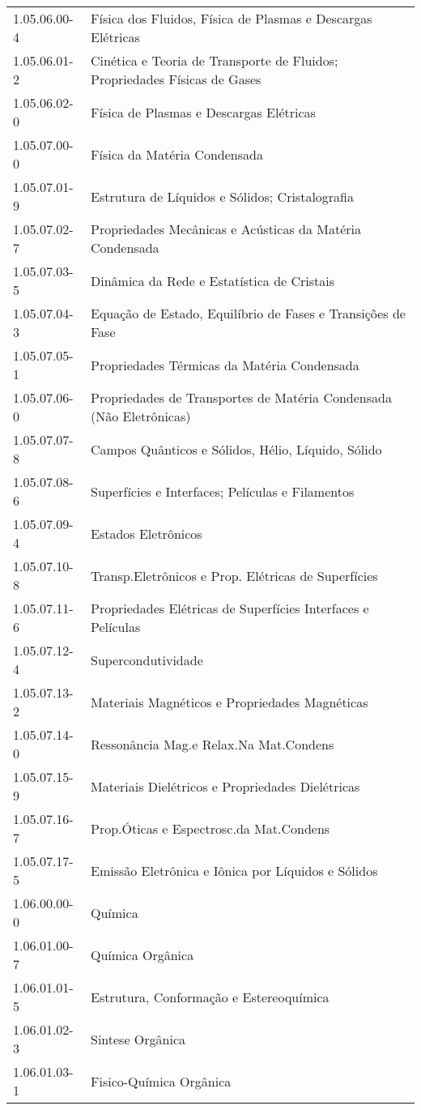 \begin{longtable}[c]{p{2.15cm}p{13cm}}
1.05.06.00-4 & Física dos Fluidos, Física de Plasmas e Descargas Elétricas \\
1.05.06.01-2 & Cinética e Teoria de Transporte de Fluidos; Propriedades Físicas de Gases \\
1.05.06.02-0 & Física de Plasmas e Descargas Elétricas \\
1.05.07.00-0 & Física da Matéria Condensada \\
1.05.07.01-9 & Estrutura de Líquidos e Sólidos; Cristalografia \\
1.05.07.02-7 & Propriedades Mecânicas e Acústicas da Matéria Condensada \\
1.05.07.03-5 & Dinâmica da Rede e Estatística de Cristais \\
1.05.07.04-3 & Equação de Estado, Equilíbrio de Fases e Transições de Fase \\
1.05.07.05-1 & Propriedades Térmicas da Matéria Condensada \\
1.05.07.06-0 & Propriedades de Transportes de Matéria Condensada (Não Eletrônicas) \\
1.05.07.07-8 & Campos Quânticos e Sólidos, Hélio, Líquido, Sólido \\
1.05.07.08-6 & Superfícies e Interfaces; Películas e Filamentos \\
1.05.07.09-4 & Estados Eletrônicos \\
1.05.07.10-8 & Transp.Eletrônicos e Prop. Elétricas de Superfícies \\
1.05.07.11-6 & Propriedades Elétricas de Superfícies Interfaces e Películas \\
1.05.07.12-4 & Supercondutividade \\
1.05.07.13-2 & Materiais Magnéticos e Propriedades Magnéticas \\
1.05.07.14-0 & Ressonância Mag.e Relax.Na Mat.Condens \\
1.05.07.15-9 & Materiais Dielétricos e Propriedades Dielétricas \\
1.05.07.16-7 & Prop.Óticas e Espectrosc.da Mat.Condens \\
1.05.07.17-5 & Emissão Eletrônica e Iônica por Líquidos e Sólidos \\
1.06.00.00-0 & Química \\
1.06.01.00-7 & Química Orgânica \\
1.06.01.01-5 & Estrutura, Conformação e Estereoquímica \\
1.06.01.02-3 & Sintese Orgânica \\
1.06.01.03-1 & Fisico-Química Orgânica \\

\end{longtable}
